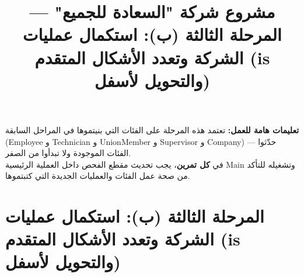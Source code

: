 \documentclass[14pt]{extarticle}
\title{مشروع شركة "السعادة للجميع" — المرحلة الثالثة (ب): استكمال عمليات الشركة وتعدد الأشكال المتقدم (\textenglish{is} والتحويل لأسفل)}
\begin{document}
\maketitle
\thispagestyle{fancy}

\begin{boxWarning}
\textbf{تعليمات هامة للعمل:}
تعتمد هذه المرحلة على الفئات التي بنيتموها في المراحل السابقة (\textenglish{Employee} و \textenglish{Technician} و \textenglish{UnionMember} و \textenglish{Supervisor} و \textenglish{Company}) — حدّثوا الفئات الموجودة ولا تبدأوا من الصفر. \\
في \textbf{كل تمرين}، يجب تحديث مقطع الفحص داخل العملية الرئيسية \textenglish{Main} وتشغيله للتأكد من صحة عمل الفئات والعمليات الجديدة التي كتبتموها.
\end{boxWarning}

\section*{المرحلة الثالثة (ب): استكمال عمليات الشركة وتعدد الأشكال المتقدم (\textenglish{is} والتحويل لأسفل)}
\end{document}
